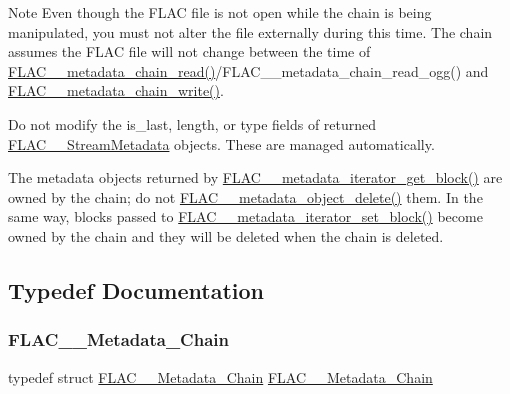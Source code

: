 \begin{DoxyNote}{Note}
Even though the F\+L\+AC file is not open while the chain is being manipulated, you must not alter the file externally during this time. The chain assumes the F\+L\+AC file will not change between the time of \hyperlink{group__flac__metadata__level2_gadb7d8e9a82aeb43e256f0a948adf5c45}{F\+L\+A\+C\+\_\+\+\_\+metadata\+\_\+chain\+\_\+read()}/\+F\+L\+A\+C\+\_\+\+\_\+metadata\+\_\+chain\+\_\+read\+\_\+ogg() and \hyperlink{group__flac__metadata__level2_gaa15ead7230217de8e79f4af822cda490}{F\+L\+A\+C\+\_\+\+\_\+metadata\+\_\+chain\+\_\+write()}.

Do not modify the is\+\_\+last, length, or type fields of returned \hyperlink{struct_f_l_a_c_____stream_metadata}{F\+L\+A\+C\+\_\+\+\_\+\+Stream\+Metadata} objects. These are managed automatically.

The metadata objects returned by \hyperlink{group__flac__metadata__level2_ga4a2b00a4312d178a9f55c2e2f8b08904}{F\+L\+A\+C\+\_\+\+\_\+metadata\+\_\+iterator\+\_\+get\+\_\+block()} are owned by the chain; do not \hyperlink{group__flac__metadata__object_ga66bbe27dba68ba77be5af83986a280ea}{F\+L\+A\+C\+\_\+\+\_\+metadata\+\_\+object\+\_\+delete()} them. In the same way, blocks passed to \hyperlink{group__flac__metadata__level2_gab40c33a0bf35a2932a5c13f5230e0d9e}{F\+L\+A\+C\+\_\+\+\_\+metadata\+\_\+iterator\+\_\+set\+\_\+block()} become owned by the chain and they will be deleted when the chain is deleted. 
\end{DoxyNote}


\subsection{Typedef Documentation}
\mbox{\label{group__flac__metadata__level2_gaec6993c60b88f222a52af86f8f47bfdf}} 
\subsubsection{\texorpdfstring{F\+L\+A\+C\+\_\+\+\_\+\+Metadata\+\_\+\+Chain}{FLAC\_\_Metadata\_Chain}}
{\footnotesize\ttfamily typedef struct \hyperlink{group__flac__metadata__level2_gaec6993c60b88f222a52af86f8f47bfdf}{F\+L\+A\+C\+\_\+\+\_\+\+Metadata\+\_\+\+Chain} \hyperlink{group__flac__metadata__level2_gaec6993c60b88f222a52af86f8f47bfdf}{F\+L\+A\+C\+\_\+\+\_\+\+Metadata\+\_\+\+Chain}}

